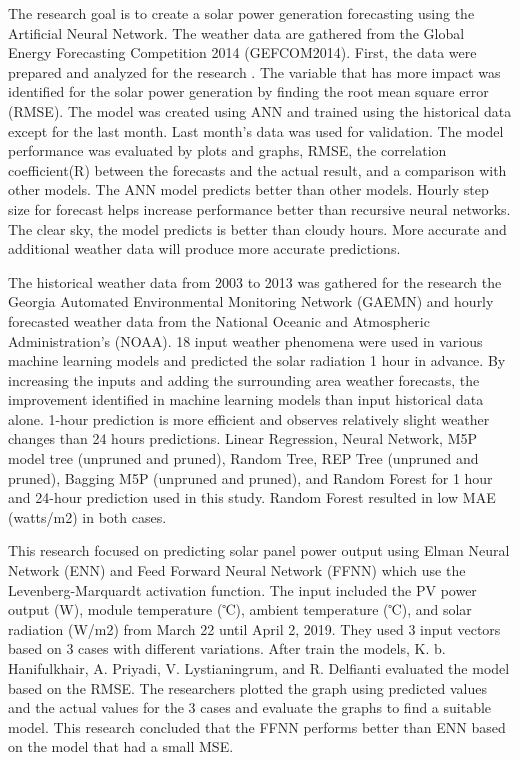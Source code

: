 \documentclass[conference]{IEEEtran}
\begin{document}
The research\cite{Mohamed} goal is to create a solar power generation forecasting using the Artificial Neural Network. The weather data are gathered from the Global Energy Forecasting Competition 2014 (GEFCOM2014).  First, the data were prepared and analyzed for the research \cite{Mohamed}. The variable that has more impact was identified for the solar power generation by finding the root mean square error (RMSE). The model was created using ANN and trained using the historical data except for the last month. Last month's data was used for validation. The model performance was evaluated by plots and graphs, RMSE, the correlation coefficient(R) between the forecasts and the actual result, and a comparison with other models. The ANN model predicts better than other models. Hourly step size for forecast helps increase performance better than recursive neural networks. The clear sky, the model predicts is better than cloudy hours. More accurate and additional weather data will produce more accurate predictions.

The historical weather data from 2003 to 2013 was gathered for the research\cite{Sam} the Georgia Automated Environmental Monitoring Network (GAEMN) and hourly forecasted weather data from the National Oceanic and Atmospheric Administration's (NOAA). 18 input weather phenomena were used in various machine learning models and predicted the solar radiation 1 hour in advance. By increasing the inputs and adding the surrounding area weather forecasts, the improvement identified in machine learning models than input historical data alone. 1-hour prediction is more efficient and observes relatively slight weather changes than 24 hours predictions. Linear Regression, Neural Network, M5P model tree (unpruned and pruned), Random Tree, REP Tree (unpruned and pruned), Bagging M5P (unpruned and pruned), and Random Forest for 1 hour and 24-hour prediction used in this study\cite{Sam}. Random Forest resulted in low MAE (watts/m2) in both cases.


This research\cite{9163783} focused on predicting solar panel power output using Elman Neural Network (ENN) and Feed Forward Neural Network (FFNN) which use the Levenberg-Marquardt activation function. The input included the PV power output (W), module temperature (℃), ambient temperature (℃), and solar radiation (W/m2) from March 22 until April 2, 2019. They\cite{9163783}  used 3 input vectors based on 3 cases with different variations. After train the models, K. b. Hanifulkhair, A. Priyadi, V. Lystianingrum, and R. Delfianti evaluated the model based on the RMSE. The researchers plotted the graph using predicted values and the actual values for the 3 cases and evaluate the graphs to find a suitable model. This research\cite{9163783} concluded that the FFNN performs better than ENN based on the model that had a small MSE.
\end{document}
